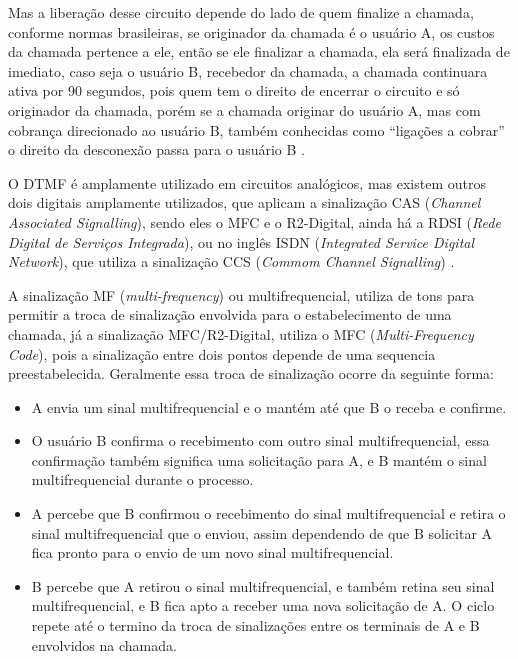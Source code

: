 Mas a liberação desse circuito depende do lado de quem finalize a chamada, conforme normas brasileiras, se originador da chamada é o usuário A, os custos da chamada pertence a ele, então se ele finalizar a chamada, ela será finalizada de imediato, caso seja o usuário B, recebedor da chamada, a chamada continuara ativa por 90 segundos, pois quem tem o direito de encerrar o circuito e só originador da chamada, porém se a chamada originar do usuário A, mas com cobrança direcionado ao usuário B, também conhecidas como “ligações a cobrar” o direito da desconexão passa para o usuário B \cite{andersonramires2005}.

O DTMF é amplamente utilizado em circuitos analógicos, mas existem outros dois digitais amplamente utilizados, que aplicam a sinalização CAS (\textit{Channel Associated Signalling}), sendo eles o MFC e o R2-Digital, ainda há a RDSI (\textit{Rede Digital de Serviços Integrada}), ou no inglês ISDN (\textit{Integrated Service Digital Network}), que utiliza a sinalização CCS (\textit{Commom Channel Signalling}) \cite{alexandrekeller2014}.

A sinalização MF (\textit{multi-frequency}) ou multifrequencial, utiliza de tons para permitir a troca de sinalização envolvida para o estabelecimento de uma chamada, já a sinalização MFC/R2-Digital, utiliza o MFC (\textit{Multi-Frequency Code}), pois a sinalização entre dois pontos depende de uma sequencia preestabelecida. Geralmente essa troca de sinalização ocorre da seguinte forma: \cite{davidson2008}

\begin{itemize}
  \item A envia um sinal multifrequencial e o mantém até que B o receba e confirme.
  \item O usuário B confirma o recebimento com outro sinal multifrequencial, essa confirmação também significa uma solicitação para A, e B mantém o sinal multifrequencial durante o processo.
  \item A percebe que B confirmou o recebimento do sinal multifrequencial e retira o sinal multifrequencial que o enviou, assim dependendo de que B solicitar A fica pronto para o envio de um novo sinal multifrequencial.
  \item B percebe que A retirou o sinal multifrequencial, e também retina seu sinal multifrequencial, e B fica apto a receber uma nova solicitação de A. O ciclo repete até o termino da troca de sinalizações entre os terminais de A e B envolvidos na chamada.
\end{itemize}

